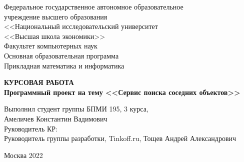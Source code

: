 \begin{titlepage}
    \newpage
    
    {
    \begin{center}
    Федеральное государственное автономное образовательное \\
    учреждение высшего образования \\
    \vspace{1em}
    <<Национальный исследовательский университет \\
    <<Высшая школа экономики>>
    \\
    \vspace{4em}
    Факультет компьютерных наук \\
    \vspace{1em}
    Основная образовательная программа \\
    Прикладная математика и информатика \\
    \end{center}
    }
    
    \vspace{10em}
    
    \begin{center}
        \textbf{КУРСОВАЯ РАБОТА}
        \vspace{2em}
        \\
        \textbf{
            Программный проект на тему
            \linebreak
            <<Сервис поиска соседних объектов>>
        }
    \end{center}
    
    \vspace{8em}
    
    {
    \hfill\parbox{16cm}{
    \hspace*{5cm}\hspace*{-5cm}Выполнил студент группы БПМИ 195, 3 курса,\\
    Амеличев Константин Вадимович\\
     
    \hspace*{5cm}\hspace*{-5cm}Руководитель КР:\\
    Руководитель группы разработки, Tinkoff.ru, Тощев Андрей Александрович\\
    
    }
    }
    
    \vspace{\fill}

\begin{center}
Москва 2022
\end{center}
    
\end{titlepage}